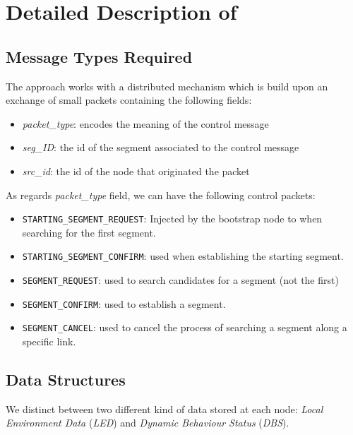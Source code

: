 \section{Detailed Description of \disr{}}
\subsection{Message Types Required}

The \disr{} approach works with a distributed mechanism which is build
upon an exchange of small packets containing the following fields:
\begin{itemize}
\item \emph{packet\_type}: encodes the meaning of the control message
\item \emph{seg\_ID}: the id of the segment associated to the \disr{} control message
\item \emph{src\_id}: the id of the node that originated the packet
\end{itemize}

As regards \emph{packet\_type} field, we can have the following control packets:
\begin{itemize}
\item{\texttt{STARTING\_SEGMENT\_REQUEST}}: Injected by the bootstrap
node to when searching for the first segment. 
\item{\texttt{STARTING\_SEGMENT\_CONFIRM}}: used when establishing
the starting  segment. 
\item{\texttt{SEGMENT\_REQUEST}}: used to search candidates for a segment (not the
first)
\item{\texttt{SEGMENT\_CONFIRM}}: used to establish a segment. 
\item{\texttt{SEGMENT\_CANCEL}}: used to cancel the process of searching a segment along a
specific link.
\end{itemize}


\subsection{\disr{} Data Structures}
\label{ssec:disr_dstruct}

We distinct between two different kind of data stored at each node:
\emph{Local Environment Data} (\emph{LED}) and \emph{Dynamic Behaviour
Status} (\emph{DBS}).

